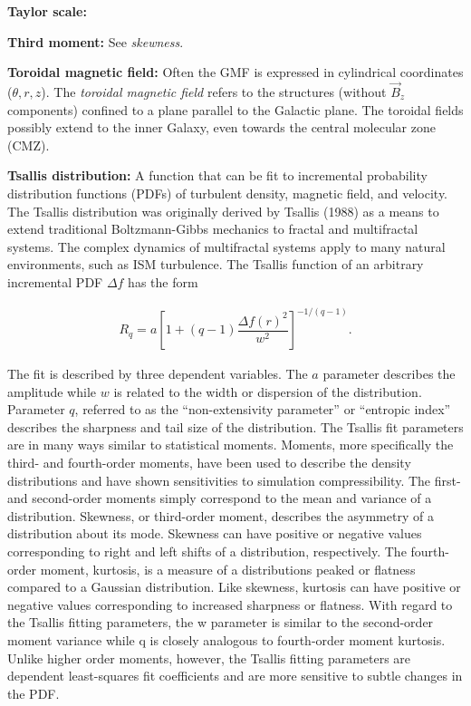 \documentclass[a4paper,10pt]{article}
\begin{document}
{\noindent}\textbf{Taylor scale:}

{\noindent}\textbf{Third moment:} See \textit{skewness}.

{\noindent}\textbf{Toroidal magnetic field:} Often the GMF is expressed in cylindrical coordinates ($\theta, r, z$). The \textit{toroidal magnetic field} refers to the structures (without $\vec{B}_z$ components) confined to a plane parallel to the Galactic plane. The toroidal fields possibly extend to the inner Galaxy, even towards the central molecular zone (CMZ).

{\noindent}\textbf{Tsallis distribution:} A function that can be fit to incremental probability distribution functions (PDFs) of turbulent density, magnetic field, and velocity. The Tsallis distribution was originally derived by Tsallis (1988) as a means to extend traditional Boltzmann-Gibbs mechanics to fractal and multifractal systems. The complex dynamics of multifractal systems apply to many natural environments, such as ISM turbulence. The Tsallis function of an arbitrary incremental PDF $\Delta f$ has the form

\begin{align*}
    R_q = a \left[ 1+(q-1) \dfrac{\Delta f(r)^2}{w^2} \right]^{-1/(q-1)}.
\end{align*}

{\noindent}The fit is described by three dependent variables. The $a$ parameter describes the amplitude while $w$ is related to the width or dispersion of the distribution. Parameter $q$, referred to as the ``non-extensivity parameter'' or ``entropic index'' describes the sharpness and tail size of the distribution. The Tsallis fit parameters are in many ways similar to statistical moments. Moments, more specifically the third- and fourth-order moments, have been used to describe the density distributions and have shown sensitivities to simulation compressibility. The first- and second-order moments simply correspond to the mean and variance of a distribution. Skewness, or third-order moment, describes the asymmetry of a distribution about its mode. Skewness can have positive or negative values corresponding to right and left shifts of a distribution, respectively. The fourth-order moment, kurtosis, is a measure of a distributions peaked or flatness compared to a Gaussian distribution. Like skewness, kurtosis can have positive or negative values corresponding to increased sharpness or flatness. With regard to the Tsallis fitting parameters, the w parameter is similar to the second-order moment variance while q is closely analogous to fourth-order moment kurtosis. Unlike higher order moments, however, the Tsallis fitting parameters are dependent least-squares fit coefficients and are more sensitive to subtle changes in the PDF.
\end{document}
